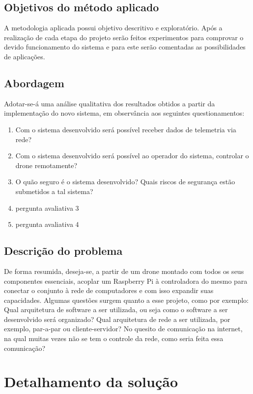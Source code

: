 \documentclass[12pt,a4paper,oneside]{book}
\begin{document}
\section{Objetivos do método aplicado}
A metodologia aplicada possui objetivo descritivo e exploratório. Após a realização de cada etapa do projeto serão feitos experimentos para comprovar o devido funcionamento do sistema e para este serão comentadas as possibilidades de aplicações.

\section{Abordagem}
Adotar-se-á uma análise qualitativa dos resultados obtidos a partir da implementação do novo sistema, em observância aos seguintes questionamentos:
\begin{enumerate}
    \item Com o sistema desenvolvido será possível receber dados de telemetria via rede?
    \item Com o sistema desenvolvido será possível ao operador do sistema, controlar o drone remotamente?
    \item O quão seguro é o sistema desenvolvido? Quais riscos de segurança estão submetidos a tal sistema?
    \item pergunta avaliativa 3
    \item pergunta avaliativa 4
\end{enumerate}
%
%

\section{Descrição do problema}
De forma resumida, deseja-se, a partir de um drone montado com todos os seus componentes essenciais, acoplar um Raspberry Pi à controladora do mesmo para conectar o conjunto à rede de computadores e com isso expandir suas capacidades. Algumas questões surgem quanto a esse projeto, como por exemplo: Qual arquitetura de software a ser utilizada, ou seja como o software a ser desenvolvido será organizado? Qual arquitetura de rede a ser utilizada, por exemplo, par-a-par ou cliente-servidor? No quesito de comunicação na internet, na qual muitas vezes não se tem o controle da rede, como seria feita essa comunicação?

%
\chapter{Detalhamento da solução}
%
\thispagestyle{empty} 
%
\end{document}
